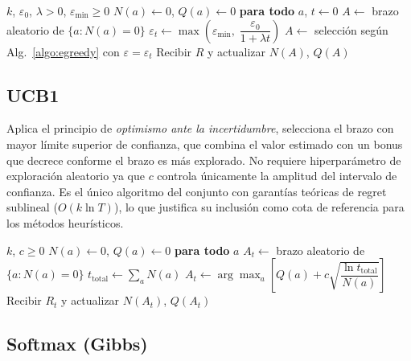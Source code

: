 \begin{algorithm}
\caption{$\varepsilon$-Decaimiento}\label{algo:edecay}
\begin{algorithmic}[1]
\Require $k$, $\varepsilon_0$, $\lambda > 0$, $\varepsilon_{\min} \geq 0$
\State $N(a) \gets 0$, $Q(a) \gets 0$ \textbf{para todo} $a$, $t \gets 0$
        \State $A \gets$ brazo aleatorio de $\{a : N(a) = 0\}$ 
    \Else
        \State $\varepsilon_t \gets \max\!\left(\varepsilon_{\min},\; \dfrac{\varepsilon_0}{1+\lambda t}\right)$
        \State $A \gets$ selección según Alg.~\ref{algo:egreedy} con $\varepsilon = \varepsilon_t$
    \EndIf
    \State Recibir $R$ y actualizar $N(A)$, $Q(A)$
\EndFor
\end{algorithmic}
\end{algorithm}

\subsection*{UCB1}

Aplica el principio de \textit{optimismo ante la incertidumbre}, selecciona el brazo con mayor límite superior de confianza, que combina el valor estimado con un bonus que decrece conforme el brazo es más explorado. No requiere hiperparámetro de exploración aleatorio ya que $c$ controla únicamente la amplitud del intervalo de confianza. Es el único algoritmo del conjunto con garantías teóricas de regret sublineal ($O(k \ln T)$), lo que justifica su inclusión como cota de referencia para los métodos heurísticos.

\begin{algorithm}
\caption{UCB1}\label{algo:ucb1}
\begin{algorithmic}[1]
\Require $k$, $c \geq 0$
\State $N(a) \gets 0$, $Q(a) \gets 0$ \textbf{para todo} $a$
        \State $A_t \gets$ brazo aleatorio de $\{a : N(a) = 0\}$ 
    \Else
        \State $t_{\text{total}} \gets \sum_a N(a)$
        \State $A_t \gets \arg\max_{a}\!\left[ Q(a) + c\sqrt{\dfrac{\ln t_{\text{total}}}{N(a)}} \right]$
    \EndIf
    \State Recibir $R_t$ y actualizar $N(A_t)$, $Q(A_t)$
\EndFor
\end{algorithmic}
\end{algorithm}

\subsection*{Softmax (Gibbs)}

